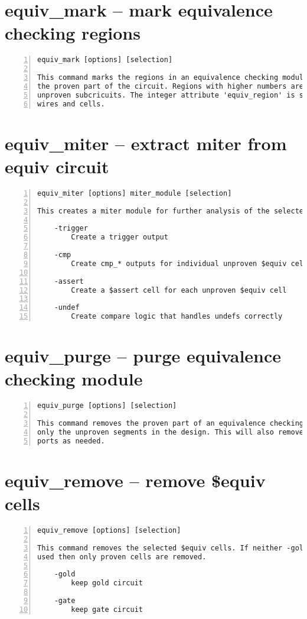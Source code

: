 \section{equiv\_mark -- mark equivalence checking regions}
\label{cmd:equiv_mark}
\begin{lstlisting}[numbers=left,frame=single]
    equiv_mark [options] [selection]

This command marks the regions in an equivalence checking module. Region 0 is
the proven part of the circuit. Regions with higher numbers are connected
unproven subcricuits. The integer attribute 'equiv_region' is set on all
wires and cells.
\end{lstlisting}

\section{equiv\_miter -- extract miter from equiv circuit}
\label{cmd:equiv_miter}
\begin{lstlisting}[numbers=left,frame=single]
    equiv_miter [options] miter_module [selection]

This creates a miter module for further analysis of the selected $equiv cells.

    -trigger
        Create a trigger output

    -cmp
        Create cmp_* outputs for individual unproven $equiv cells

    -assert
        Create a $assert cell for each unproven $equiv cell

    -undef
        Create compare logic that handles undefs correctly
\end{lstlisting}

\section{equiv\_purge -- purge equivalence checking module}
\label{cmd:equiv_purge}
\begin{lstlisting}[numbers=left,frame=single]
    equiv_purge [options] [selection]

This command removes the proven part of an equivalence checking module, leaving
only the unproven segments in the design. This will also remove and add module
ports as needed.
\end{lstlisting}

\section{equiv\_remove -- remove \$equiv cells}
\label{cmd:equiv_remove}
\begin{lstlisting}[numbers=left,frame=single]
    equiv_remove [options] [selection]

This command removes the selected $equiv cells. If neither -gold nor -gate is
used then only proven cells are removed.

    -gold
        keep gold circuit

    -gate
        keep gate circuit
\end{lstlisting}

